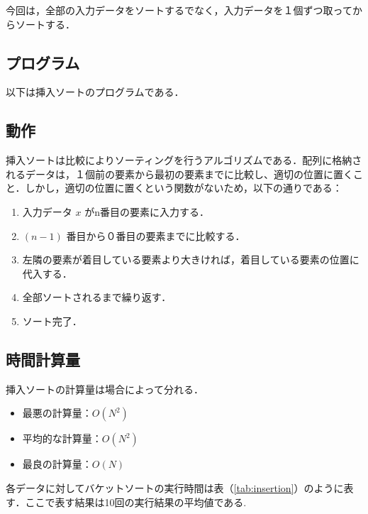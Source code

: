\documentclass[a4j, titlepage]{jarticle}
\begin{document}
        今回は，全部の入力データをソートするでなく，入力データを１個ずつ取ってからソートする．
    
        \subsection{プログラム}
            以下は挿入ソートのプログラムである．
            

        \subsection{動作}
            挿入ソートは比較によりソーティングを行うアルゴリズムである．配列に格納されるデータは，１個前の要素から最初の要素までに比較し、適切の位置に置くこと．しかし，適切の位置に置くという関数がないため，以下の通りである：
            
            \begin{enumerate}
                \item 入力データ $x$ がn番目の要素に入力する．
                \item $(n-1)$ 番目から０番目の要素までに比較する．
                \item 左隣の要素が着目している要素より大きければ，着目している要素の位置に代入する．
                \item 全部ソートされるまで繰り返す．
                \item ソート完了．
            \end{enumerate}
        
        \subsection{時間計算量}
            挿入ソートの計算量は場合によって分れる．
            \begin{itemize}
                \item 最悪の計算量：$O(N^2)$
                \item 平均的な計算量：$O(N^2)$
                \item 最良の計算量：$O(N)$
            \end{itemize}

            各データに対してバケットソートの実行時間は表（\ref{tab:insertion}）のように表す．ここで表す結果は10回の実行結果の平均値である.
\end{document}
